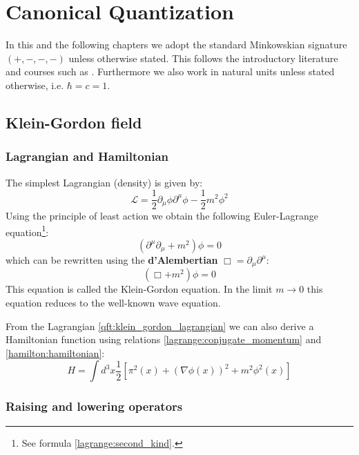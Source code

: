 \chapter{Canonical Quantization}

	In this and the following chapters we adopt the standard Minkowskian signature $(+, -, -, -)$ unless otherwise stated. This follows the introductory literature and courses such as \cite{Peskin}. Furthermore we also work in natural units unless stated otherwise, i.e. $\hbar = c = 1$.

\section{Klein-Gordon field}
\subsection{Lagrangian and Hamiltonian}

	The simplest Lagrangian (density) is given by:
	\begin{equation}
		\label{qft:klein_gordon_lagrangian}
		\boxed{\mathcal{L} = \frac{1}{2}\partial_\mu\phi\partial^\mu\phi - \frac{1}{2}m^2\phi^2}
	\end{equation}
	Using the principle of least action we obtain the following Euler-Lagrange equation\footnote{See formula \ref{lagrange:second_kind}.}:
	\begin{equation}
		\left(\partial^\mu\partial_\mu + m^2\right)\phi = 0
	\end{equation}
	which can be rewritten using the \textbf{d'Alembertian} $\Box = \partial_\mu\partial^\mu$:
	\begin{equation}
		\label{qft:klein_gordon_equation}
		\boxed{(\Box+m^2)\phi = 0}
	\end{equation}
	This equation is called the Klein-Gordon equation. In the limit $m\rightarrow0$ this equation reduces to the well-known wave equation.
	
	From the Lagrangian \ref{qft:klein_gordon_lagrangian} we can also derive a Hamiltonian function using relations \ref{lagrange:conjugate_momentum} and \ref{hamilton:hamiltonian}:
	\begin{equation}
		\label{qft:klein_gordon_hamiltonian}
		\boxed{H = \int d^3x \frac{1}{2}\left[\pi^2(x) + (\nabla\phi(x))^2 + m^2\phi^2(x)\right]}
	\end{equation}
	
	
\subsection{Raising and lowering operators}

